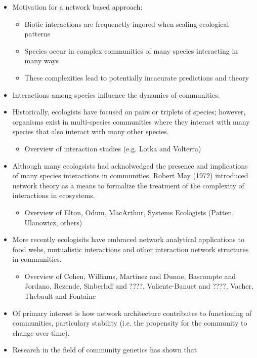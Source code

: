 \documentclass[12pt]{article}
\begin{document}
\begin{itemize}
\item Motivation for a network based approach:
  \begin{itemize}
  \item Biotic interactions are frequenctly ingored when scaling
    ecological patterns
  \item Species occur in complex communities of many species
    interacting in many ways
  \item These complexities lead to potentially incacurate predictions
    and theory
  \end{itemize}
\item Interactions among species influence the dynamics of
  communities.
\item Historically, ecologists have focused on pairs or triplets of
  species; however, organisms exist in multi-species communities where
  they interact with many species that also interact with many other
  species.
  \begin{itemize}
  \item Overview of interaction studies (e.g. Lotka and Volterra)
  \end{itemize}
\item Although many ecologsists had acknolwedged the presence and
  implications of many species interactions in communities, Robert May
  (1972) introduced network theory as a means to formalize the
  treatment of the complexity of interactions in ecosystems.
  \begin{itemize}
  \item Overview of Elton, Odum, MacArthur, Systems Ecologists
    (Patten, Ulanowicz, others)
  \end{itemize}
\item More recently ecologisits have embraced network analytical
  applications to food webs, mutualistic interactions and other
  interaction network structures in communities.
  \begin{itemize}
  \item Overview of Cohen, Williams, Martinez and Dunne, Bascompte and
    Jordano, Rezende, Sinberloff and ????, Valiente-Banuet and ????,
    Vacher, Thebault and Fontaine
  \end{itemize}
\item Of primary interest is how network architecture contributes to
  functioning of communities, particulary stability (i.e. the
  propensity for the community to change over time).
\item Research in the field of community genetics has shown that

\end{itemize}
\end{document}
